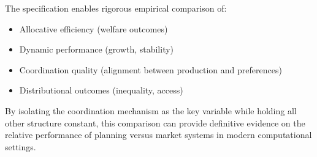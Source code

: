\documentclass[12pt,a4paper]{article}
\theoremstyle{definition}
\theoremstyle{remark}
\begin{document}
The specification enables rigorous empirical comparison of:
\begin{itemize}
    \item Allocative efficiency (welfare outcomes)
    \item Dynamic performance (growth, stability)
    \item Coordination quality (alignment between production and preferences)
    \item Distributional outcomes (inequality, access)
\end{itemize}

By isolating the coordination mechanism as the key variable while holding all other structure constant, this comparison can provide definitive evidence on the relative performance of planning versus market systems in modern computational settings.
\end{document}
